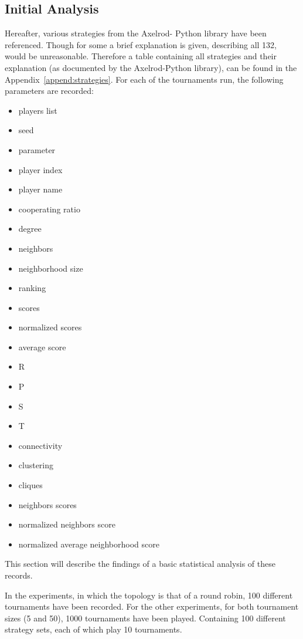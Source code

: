 \subsection{Initial Analysis}
\label{sub:initial_analysis}
Hereafter, various strategies from the Axelrod- Python library have been referenced.
Though for some a brief explanation is given, describing all 132, would be
unreasonable. Therefore a table containing all strategies and their explanation
(as documented by the Axelrod-Python library), can be found in the Appendix~\ref{append:strategies}.
For each of the tournaments run, the following parameters are recorded:

\begin{multicols}{3}
	\begin{itemize}
		\item players list
		\item seed
		\item parameter
		\item player index
		\item player name
		\item cooperating ratio
		\item degree
		\item neighbors
		\item neighborhood size
		\item ranking
		\item scores
		\item normalized scores
		\item average score
		\item R
		\item P
		\item S
		\item T
		\item connectivity
		\item clustering
		\item cliques
		\item neighbors scores
		\item normalized neighbors score
		\item normalized average neighborhood score
	\end{itemize}
\end{multicols}

This section will describe the findings of a basic statistical analysis of these
records.

In the experiments, in which the topology is that of a round robin,
100 different tournaments have been recorded.
For the other experiments, for both tournament sizes (5 and 50),
1000 tournaments have been played. Containing 100 different strategy sets, each of
which play 10 tournaments.

